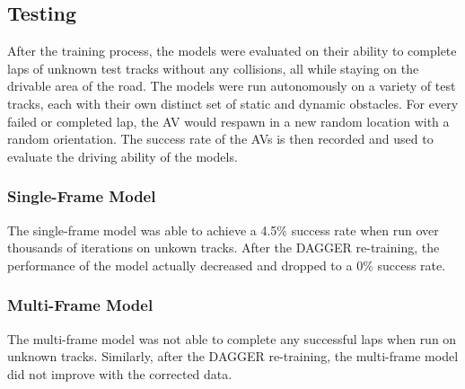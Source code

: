 \documentclass[conference]{IEEEtran}
\begin{document}
\subsection{Testing}
After the training process, the models were evaluated on their ability to complete laps of unknown 
test tracks without any collisions, all while staying on the drivable area of the road. The models
were run autonomously on a variety of test tracks, each with their own distinct set of static and 
dynamic obstacles. For every failed or completed lap, the AV would respawn in a new random location 
with a random orientation. The success rate of the AVs is then recorded and used to evaluate 
the driving ability of the models. 
\subsubsection{Single-Frame Model}
The single-frame model was able to achieve a 4.5\% success rate when run over thousands of iterations
on unkown tracks. After the DAGGER re-training, the performance of the model actually decreased and 
dropped to a 0\% success rate.
\subsubsection{Multi-Frame Model}
The multi-frame model was not able to complete any successful laps when run on unknown tracks. Similarly,
after the DAGGER re-training, the multi-frame model did not improve with the corrected data.
\end{document}
